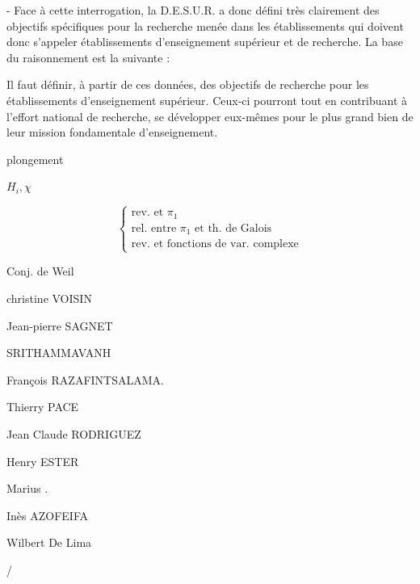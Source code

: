 - Face à cette interrogation, la D.E.S.U.R. a donc défini très clairement des objectifs spécifiques pour la recherche menée dans les établissements qui doivent donc s'appeler établissements d'enseignement supérieur et de recherche. La base du raisonnement est la suivante :


Il faut définir, à partir de ces données, des objectifs de recherche pour les établissements d'enseignement supérieur. Ceux-ci pourront tout en contribuant à l'effort national de recherche, se développer eux-mêmes pour le plus grand bien de leur mission fondamentale d'enseignement.



plongement

$H_i,\chi$

\[
\left\{\begin{array}{l}
\text{rev. et }\pi_1\\
\text{rel. entre }\pi_1\text{ et th. de Galois}\\
\text{rev. et fonctions de var. complexe}
\end{array}\right.
\]

Conj. de Weil


\begin{minipage}[t]{.54\linewidth}
christine VOISIN

Jean-pierre SAGNET

 SRITHAMMAVANH

François RAZAFINTSALAMA.

Thierry PACE

Jean Claude RODRIGUEZ

Henry ESTER

Marius .

Inès AZOFEIFA

Wilbert De Lima
\end{minipage}
\hfill
\begin{minipage}[t]{.42\linewidth}
\uline{} / \uline{}
\end{minipage}

